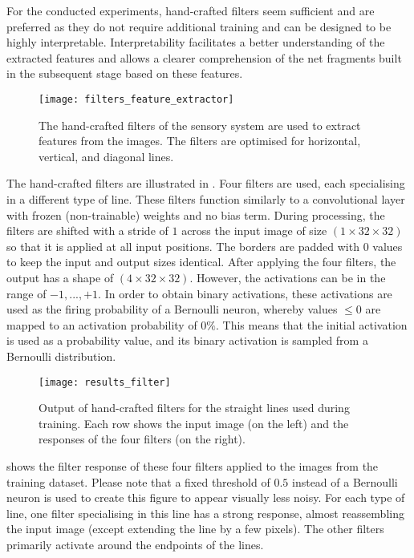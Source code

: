 For the conducted experiments, hand-crafted filters seem sufficient and are preferred as they do not require additional training and can be designed to be highly interpretable. Interpretability facilitates a better understanding of the extracted features and allows a clearer comprehension of the net fragments built in the subsequent stage based on these features. 

\begin{figure}[h]
    \centering
    \texttt{[image: filters\_feature\_extractor]}
    \caption[Hand-crafted filters of the sensory system]{The hand-crafted filters of the sensory system are used to extract features from the images. The filters are optimised for horizontal, vertical, and diagonal lines.}
\end{figure}

The hand-crafted filters are illustrated in .
Four filters are used, each specialising in a different type of line.
These filters function similarly to a convolutional layer with frozen (non-trainable) weights and no bias term. 
During processing, the filters are shifted with a stride of $1$ across the input image of size $(1 \times 32 \times 32)$ so that it is applied at all input positions. 
The borders are padded with $0$ values to keep the input and output sizes identical.
After applying the four filters, the output has a shape of $(4 \times 32 \times 32)$. 
However, the activations can be in the range of $-1, ..., +1$.
In order to obtain binary activations, these activations are used as the firing probability of a Bernoulli neuron, whereby values $\leq 0$ are mapped to an activation probability of $0\%$.
This means that the initial activation is used as a probability value, and its binary activation is sampled from a Bernoulli distribution.


\begin{figure}[h]
    \centering
    \texttt{[image: results\_filter]}
    \caption[Output of hand-crafted filters for straight lines]{Output of hand-crafted filters for the straight lines used during training. Each row shows the input image (on the left) and the responses of the four filters (on the right).}
\end{figure}

 shows the filter response of these four filters applied to the images from the training dataset.
Please note that a fixed threshold of $0.5$ instead of a Bernoulli neuron is used to create this figure to appear visually less noisy.
For each type of line, one filter specialising in this line has a strong response, almost reassembling the input image (except extending the line by a few pixels).
The other filters primarily activate around the endpoints of the lines.


